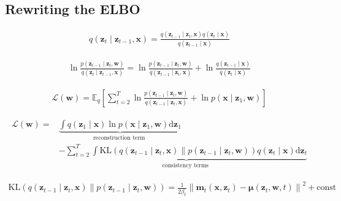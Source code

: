 \documentclass{article}
\begin{document}
\subsection{Rewriting the ELBO}

\begin{align*}
q\left(\mathbf{z}_{t} \mid \mathbf{z}_{t-1}, \mathbf{x}\right)=\frac{q\left(\mathbf{z}_{t-1} \mid \mathbf{z}_{t}, \mathbf{x}\right) q\left(\mathbf{z}_{t} \mid \mathbf{x}\right)}{q\left(\mathbf{z}_{t-1} \mid \mathbf{x}\right)} 
\tag{20.29}
\end{align*}

\begin{align*}
\ln \frac{p\left(\mathbf{z}_{t-1} \mid \mathbf{z}_{t}, \mathbf{w}\right)}{q\left(\mathbf{z}_{t} \mid \mathbf{z}_{t-1}, \mathbf{x}\right)}=\ln \frac{p\left(\mathbf{z}_{t-1} \mid \mathbf{z}_{t}, \mathbf{w}\right)}{q\left(\mathbf{z}_{t-1} \mid \mathbf{z}_{t}, \mathbf{x}\right)}+\ln \frac{q\left(\mathbf{z}_{t-1} \mid \mathbf{x}\right)}{q\left(\mathbf{z}_{t} \mid \mathbf{x}\right)} 
\tag{20.30}
\end{align*}

\begin{align*}
\mathcal{L}(\mathbf{w})=\mathbb{E}_{q}\left[
\sum_{t=2}^{T} \ln \frac{p\left(\mathbf{z}_{t-1} \mid \mathbf{z}_{t}, \mathbf{w}\right)}{q\left(\mathbf{z}_{t-1} \mid \mathbf{z}_{t}, \mathbf{x}\right)}+\ln p\left(\mathbf{x} \mid \mathbf{z}_{1}, \mathbf{w}\right)\right]
\tag{20.31}
\end{align*}

\begin{align*}
\mathcal{L}(\mathbf{w})= & \underbrace{\int q\left(\mathbf{z}_{1} \mid \mathbf{x}\right) \ln p\left(\mathbf{x} \mid \mathbf{z}_{1}, \mathbf{w}\right) \mathrm{d} \mathbf{z}_{1}}_{\text{reconstruction term }} \\
& -\underbrace{\sum_{t=2}^{T} \int \mathrm{KL}\left(q\left(\mathbf{z}_{t-1} \mid \mathbf{z}_{t}, \mathbf{x}\right) \| p\left(\mathbf{z}_{t-1} \mid \mathbf{z}_{t}, \mathbf{w}\right)\right) q\left(\mathbf{z}_{t} \mid \mathbf{x}\right) \mathrm{d} \mathbf{z}_{t}}_{\text{consistency terms }}
\tag{20.32}
\end{align*}

\begin{align*}
\mathrm{KL}\left(q\left(\mathbf{z}_{t-1} \mid \mathbf{z}_{t}, \mathbf{x}\right) \| p\left(\mathbf{z}_{t-1} \mid \mathbf{z}_{t}, \mathbf{w}\right)\right)
= \frac{1}{2 \beta_{t}}\left\|\mathbf{m}_{t}\left(\mathbf{x}, \mathbf{z}_{t}\right)-\boldsymbol{\mu}\left(\mathbf{z}_{t}, \mathbf{w}, t\right)\right\|^{2}+\mathrm{const}
\tag{20.33}
\end{align*}
\end{document}

